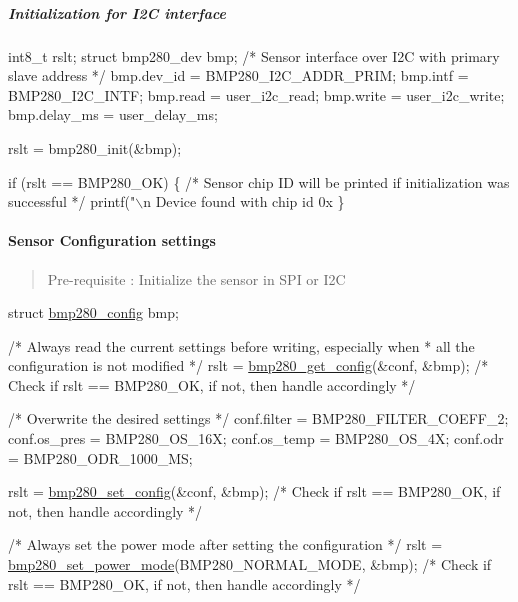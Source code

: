 \subparagraph*{Initialization for I2C interface}


\begin{DoxyCode}
int8\_t rslt;
struct bmp280\_dev bmp;
/* Sensor interface over I2C with primary slave address  */
bmp.dev\_id = BMP280\_I2C\_ADDR\_PRIM;
bmp.intf = BMP280\_I2C\_INTF;
bmp.read = user\_i2c\_read;
bmp.write = user\_i2c\_write;
bmp.delay\_ms = user\_delay\_ms;

rslt = bmp280\_init(&bmp);

if (rslt == BMP280\_OK) \{
  /* Sensor chip ID will be printed if initialization was successful */
  printf("\(\backslash\)n Device found with chip id 0x%
\}
\end{DoxyCode}


\paragraph*{Sensor Configuration settings}

\begin{quote}
Pre-\/requisite \+: Initialize the sensor in S\+PI or I2C \end{quote}



\begin{DoxyCode}
\textcolor{keyword}{struct }\mbox{\hyperlink{structbmp280__config}{bmp280\_config}} bmp;

\textcolor{comment}{/* Always read the current settings before writing, especially when}
\textcolor{comment}{ * all the configuration is not modified }
\textcolor{comment}{ */}
rslt = \mbox{\hyperlink{bmp280_8c_aded88d5f67beb1b3311bb0e26ecc19da}{bmp280\_get\_config}}(&conf, &bmp);
\textcolor{comment}{/* Check if rslt == BMP280\_OK, if not, then handle accordingly */}

\textcolor{comment}{/* Overwrite the desired settings */}
conf.filter = BMP280\_FILTER\_COEFF\_2;
conf.os\_pres = BMP280\_OS\_16X;
conf.os\_temp = BMP280\_OS\_4X;
conf.odr = BMP280\_ODR\_1000\_MS;

rslt = \mbox{\hyperlink{bmp280_8c_a61799b86b24d68b7a20814fcaf9adea8}{bmp280\_set\_config}}(&conf, &bmp);
\textcolor{comment}{/* Check if rslt == BMP280\_OK, if not, then handle accordingly */}

\textcolor{comment}{/* Always set the power mode after setting the configuration */}
rslt = \mbox{\hyperlink{bmp280_8c_a4401d930aa889a00121087f4aeac0182}{bmp280\_set\_power\_mode}}(BMP280\_NORMAL\_MODE, &bmp);
\textcolor{comment}{/* Check if rslt == BMP280\_OK, if not, then handle accordingly */}
\end{DoxyCode}


